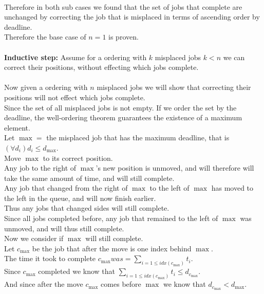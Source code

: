\documentclass{article}
\begin{document}
        \\
        Therefore in both sub cases we found that the set of jobs that complete are unchanged by correcting the job that is misplaced in terms of ascending order by deadline. \\
        Therefore the base case of $n = 1$ is proven. \\
        \\
        \textbf{Inductive step:} Assume for a ordering with $k$ misplaced jobs $k < n$ we can correct their positions, without effecting which jobs complete. \\
        \\
        Now given a ordering with $n$ misplaced jobs we will show that correcting their positions will not effect which jobs complete. \\
        Since the set of all misplaced jobs is not empty. 
        If we order the set by the deadline, the well-ordering theorem guarantees the existence of a maximum element. \\
        Let $\max =$ the misplaced job that has the maximum deadline, that is $(\forall d_{i}) d_{i} \leq d_{\max}$. \\
        Move $\max$ to its correct position. \\
        Any job to the right of $\max$'s new position is unmoved, and will therefore will take the same amount of time, and will still complete. \\
        Any job that changed from the right of $\max$ to the left of $\max$ has moved to the left in the queue, and will now finish earlier.\\
        Thus any jobs that changed sides will still complete.\\
        Since all jobs completed before, any job that remained to the left of $\max$ was unmoved, and will thus still complete. \\
        Now we consider if $\max$ will still complete. \\
        Let $c_{\max}$ be the job that after the move is one index behind $\max$. \\
        The time it took to complete $c_{\max} was = \sum_{i = 1 \leq idx(c_{\max})} t_{i}$. \\
        Since $c_{\max}$ completed we know that $\sum_{i = 1 \leq idx(c_{\max})} t_{i} \leq d_{c_{\max}}$. \\
        And since after the move $c_{\max}$ comes before $\max$ we know that $d_{c_{\max}} < d_{\max}$. \\
\end{document}
